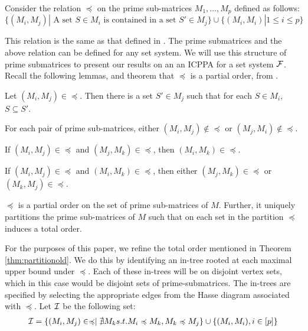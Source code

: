 \documentclass{llncs}
\def\cF{{\cal F}}
\def\cI{{\cal I}}
\begin{document}
\noindent
Consider the relation $\preccurlyeq$ on the prime sub-matrices $M_1,
\ldots, M_p$ defined as follows:
\begin{equation} 
\nonumber \{(M_i,M_j) | \mbox{ A set } S \in
  M_i \mbox{ is contained in a set } S' \in M_j\} \cup \{(M_i,M_i) | 1
  \leq i \leq p\} 
\end{equation}

\noindent
This relation is the same as that defined in \cite{nsnrs09}. The prime
submatrices and the above relation can be defined for any set
system. We will use this structure of prime submatrices to present our
results on an an ICPPA for a set system $\cF$. Recall the following
lemmas, and theorem that $\preccurlyeq$ is a partial order, from
\cite{nsnrs09}.

\begin{lemma} \label{lem:containment}
Let $(M_i,M_j) \in \preccurlyeq$.  Then there is a set $S' \in M_j$ such that for each $S \in M_i$, $S \subseteq S'$. 
\end{lemma}
\begin{lemma}
For each pair of prime sub-matrices, either $(M_i,M_j) \not\in \preccurlyeq$ or $(M_j,M_i) \not\in \preccurlyeq$.
\end{lemma}
\begin{lemma}
If $(M_i,M_j) \in \preccurlyeq $ and $(M_j,M_k) \in \preccurlyeq$, then $(M_i,M_k) \in \preccurlyeq$.
\end{lemma}
\begin{lemma} \label{lem:twoparents}
If $(M_i,M_j) \in \preccurlyeq$ and $(M_i,M_k) \in \preccurlyeq$, then
either $(M_j,M_k) \in \preccurlyeq$ or $(M_k,M_j) \in \preccurlyeq$. 
\end{lemma}
\begin{theorem} \label{thm:partitionold}
  $\preccurlyeq$ is a partial order on the set of prime sub-matrices
  of $M$.  Further, it uniquely partitions the prime sub-matrices of
  $M$ such that on each set in the partition $\preccurlyeq$ induces a
  total order.
\end{theorem}
For the purposes of this paper, we refine the total order mentioned in
Theorem \ref{thm:partitionold}. We do this by identifying an in-tree
rooted at each maximal upper bound under $\preccurlyeq$.  Each of
these in-trees will be on disjoint vertex sets, which in this case
would be disjoint sets of prime-submatrices.  The in-trees are
specified by selecting the appropriate edges from the Hasse diagram
associated with $\preccurlyeq$.  Let $\cI$ be the following set:
\begin{align*}
  \cI = \{ (M_i,M_j) \in \preccurlyeq \mid \nexists M_k s.t. M_i \preccurlyeq M_k, M_k \preccurlyeq M_j
  \} \cup \{ (M_i,M_i), i \in [p] \}
\end{align*}
\end{document}
